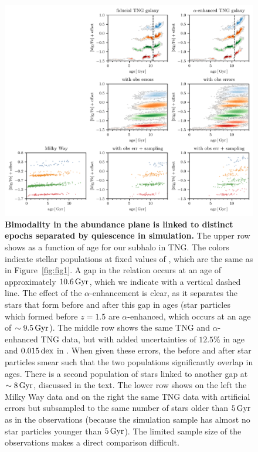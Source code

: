 \begin{figure}
  \centering
  \includegraphics[width=\textwidth]{ch4/392276_alpha.pdf}
  \caption{\textbf{Bimodality in the abundance plane is linked to distinct epochs separated by quiescence in simulation.} The upper row shows \MgFe{} as a function of age for our subhalo in TNG. The colors indicate stellar populations at fixed values of \FeH{}, which are the same as in Figure~\ref{fig:fig1}. A gap in the relation occurs at an age of approximately $10.6\,\textrm{Gyr}$, which we indicate with a vertical dashed line. The effect of the $\alpha$-enhancement is clear, as it separates the stars that form before and after this gap in ages (star particles which formed before $z=1.5$ are $\alpha$-enhanced, which occurs at an age of $\sim9.5\,\textrm{Gyr}$). The middle row shows the same TNG and $\alpha$-enhanced TNG data, but with added uncertainties of $12.5\%$ in age and $0.015\,\textrm{dex}$ in \MgFe{}. When given these errors, the before and after star particles smear such that the two populations significantly overlap in ages. There is a second population of stars linked to another gap at $\sim8\,\textrm{Gyr}$, discussed in the text. The lower row shows on the left the Milky Way data and on the right the same TNG data with artificial errors but subsampled to the same number of stars older than $5\,\textrm{Gyr}$ as in the observations (because the simulation sample has almost no star particles younger than $5\,\textrm{Gyr}$). The limited sample size of the observations makes a direct comparison difficult.}
  \label{fig:alpha}
\end{figure}

